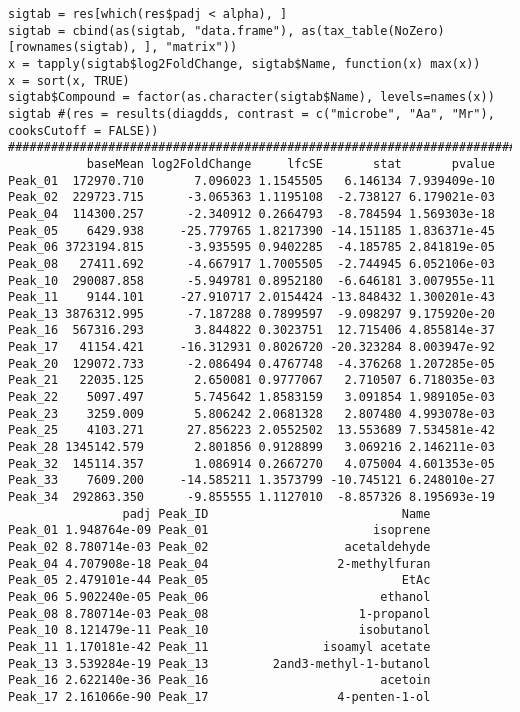 \documentclass[]{article}
\begin{document}
\begin{verbatim}
sigtab = res[which(res$padj < alpha), ]
sigtab = cbind(as(sigtab, "data.frame"), as(tax_table(NoZero)[rownames(sigtab), ], "matrix"))
x = tapply(sigtab$log2FoldChange, sigtab$Name, function(x) max(x))
x = sort(x, TRUE)
sigtab$Compound = factor(as.character(sigtab$Name), levels=names(x))
sigtab #(res = results(diagdds, contrast = c("microbe", "Aa", "Mr"), cooksCutoff = FALSE))
#######################################################################################
           baseMean log2FoldChange     lfcSE       stat       pvalue
Peak_01  172970.710       7.096023 1.1545505   6.146134 7.939409e-10
Peak_02  229723.715      -3.065363 1.1195108  -2.738127 6.179021e-03
Peak_04  114300.257      -2.340912 0.2664793  -8.784594 1.569303e-18
Peak_05    6429.938     -25.779765 1.8217390 -14.151185 1.836371e-45
Peak_06 3723194.815      -3.935595 0.9402285  -4.185785 2.841819e-05
Peak_08   27411.692      -4.667917 1.7005505  -2.744945 6.052106e-03
Peak_10  290087.858      -5.949781 0.8952180  -6.646181 3.007955e-11
Peak_11    9144.101     -27.910717 2.0154424 -13.848432 1.300201e-43
Peak_13 3876312.995      -7.187288 0.7899597  -9.098297 9.175920e-20
Peak_16  567316.293       3.844822 0.3023751  12.715406 4.855814e-37
Peak_17   41154.421     -16.312931 0.8026720 -20.323284 8.003947e-92
Peak_20  129072.733      -2.086494 0.4767748  -4.376268 1.207285e-05
Peak_21   22035.125       2.650081 0.9777067   2.710507 6.718035e-03
Peak_22    5097.497       5.745642 1.8583159   3.091854 1.989105e-03
Peak_23    3259.009       5.806242 2.0681328   2.807480 4.993078e-03
Peak_25    4103.271      27.856223 2.0552502  13.553689 7.534581e-42
Peak_28 1345142.579       2.801856 0.9128899   3.069216 2.146211e-03
Peak_32  145114.357       1.086914 0.2667270   4.075004 4.601353e-05
Peak_33    7609.200     -14.585211 1.3573799 -10.745121 6.248010e-27
Peak_34  292863.350      -9.855555 1.1127010  -8.857326 8.195693e-19
                padj Peak_ID                           Name
Peak_01 1.948764e-09 Peak_01                       isoprene
Peak_02 8.780714e-03 Peak_02                   acetaldehyde
Peak_04 4.707908e-18 Peak_04                  2-methylfuran
Peak_05 2.479101e-44 Peak_05                           EtAc
Peak_06 5.902240e-05 Peak_06                        ethanol
Peak_08 8.780714e-03 Peak_08                     1-propanol
Peak_10 8.121479e-11 Peak_10                     isobutanol
Peak_11 1.170181e-42 Peak_11                isoamyl acetate
Peak_13 3.539284e-19 Peak_13         2and3-methyl-1-butanol
Peak_16 2.622140e-36 Peak_16                        acetoin
Peak_17 2.161066e-90 Peak_17                  4-penten-1-ol

\end{verbatim}
\end{document}
